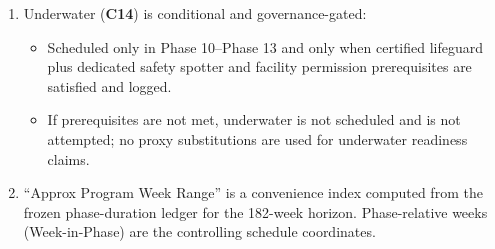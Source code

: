 \documentclass[10pt]{article}
\begin{document}
\begin{enumerate}
\item Underwater (\textbf{C14}) is conditional and governance-gated:
\begin{itemize}
\item Scheduled only in Phase 10–Phase 13 and only when certified lifeguard plus dedicated safety spotter and facility permission prerequisites are satisfied and logged.
\item If prerequisites are not met, underwater is not scheduled and is not attempted; no proxy substitutions are used for underwater readiness claims.
\end{itemize}

\item “Approx Program Week Range” is a convenience index computed from the frozen phase-duration ledger for the 182-week horizon. Phase-relative weeks (Week-in-Phase) are the controlling schedule coordinates.
\end{enumerate}

\newpage
\end{document}
